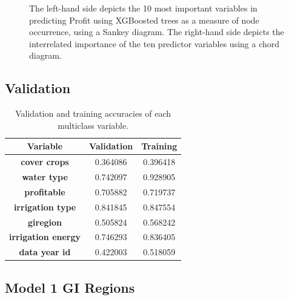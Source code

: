 \documentclass[review,12pt,authoryear]{elsarticle}
\begin{document}
\begin{linenumbers}
\begin{figure}
  \caption{The left-hand side depicts the 10 most important variables in predicting Profit using XGBoosted trees as a measure of node occurrence, using a Sankey diagram. The right-hand side depicts the interrelated importance of the ten predictor variables using a chord diagram.}\label{fig:profit_sankey}
\end{figure}

\subsection{Validation}

\begin{table}[]
  \caption{Validation and training accuracies of each multiclass variable.}
  \begin{tabular}{@{}ccc@{}}
  \toprule
  \textbf{Variable} & \textbf{Validation} & \textbf{Training} \\ \midrule
  \textbf{cover crops} & 0.364086 & 0.396418 \\
  \textbf{water type} & 0.742097 & 0.928905 \\
  \textbf{profitable} & 0.705882 & 0.719737 \\
  \textbf{irrigation type} & 0.841845 & 0.847554 \\
  \textbf{giregion} & 0.505824 & 0.568242 \\
  \textbf{irrigation energy} & 0.746293 & 0.836405 \\
  \textbf{data year id} & 0.422003 & 0.518059 \\ \bottomrule
  \end{tabular}
  \end{table}



\subsection{Model 1 GI Regions}


\end{linenumbers}
\end{document}
